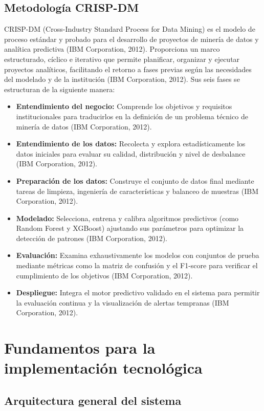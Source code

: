 \documentclass[11pt,oneside,openany]{book}
\begin{document}
\subsection{Metodología CRISP-DM}

CRISP-DM (Cross-Industry Standard Process for Data Mining) es el modelo de proceso estándar y probado para el desarrollo de proyectos de minería de datos y analítica predictiva (IBM Corporation, 2012). Proporciona un marco estructurado, cíclico e iterativo que permite planificar, organizar y ejecutar proyectos analíticos, facilitando el retorno a fases previas según las necesidades del modelado y de la institución (IBM Corporation, 2012). Sus seis fases se estructuran de la siguiente manera:

\begin{itemize}[leftmargin=*]
\item \textbf{Entendimiento del negocio:} Comprende los objetivos y requisitos institucionales para traducirlos en la definición de un problema técnico de minería de datos (IBM Corporation, 2012).
\item \textbf{Entendimiento de los datos:} Recolecta y explora estadísticamente los datos iniciales para evaluar su calidad, distribución y nivel de desbalance (IBM Corporation, 2012).
\item \textbf{Preparación de los datos:} Construye el conjunto de datos final mediante tareas de limpieza, ingeniería de características y balanceo de muestras (IBM Corporation, 2012).
\item \textbf{Modelado:} Selecciona, entrena y calibra algoritmos predictivos (como Random Forest y XGBoost) ajustando sus parámetros para optimizar la detección de patrones (IBM Corporation, 2012).
\item \textbf{Evaluación:} Examina exhaustivamente los modelos con conjuntos de prueba mediante métricas como la matriz de confusión y el F1-score para verificar el cumplimiento de los objetivos (IBM Corporation, 2012).
\item \textbf{Despliegue:} Integra el motor predictivo validado en el sistema para permitir la evaluación continua y la visualización de alertas tempranas (IBM Corporation, 2012).
\end{itemize}
\section{Fundamentos para la implementación tecnológica}

\subsection{Arquitectura general del sistema}
\end{document}
